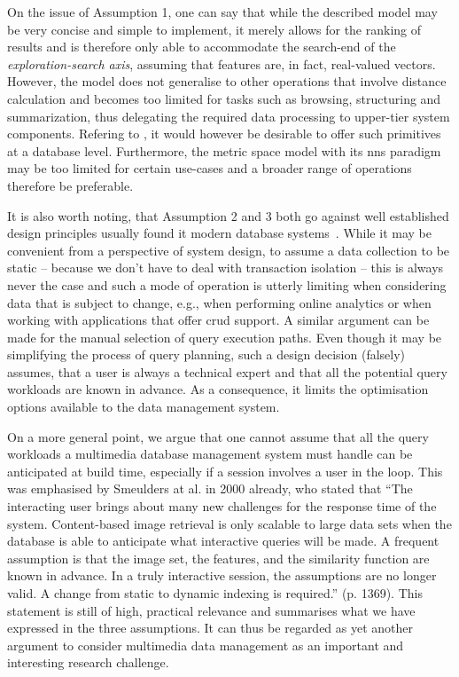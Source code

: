 On the issue of Assumption 1, one can say that while the described model may be very concise and simple to implement, it merely allows for the ranking of results and is therefore only able to accommodate the search-end of the \emph{exploration-search axis}, assuming that features are, in fact, real-valued vectors. However, the model does not generalise to other operations that involve distance calculation and becomes too limited for tasks such as browsing, structuring and summarization, thus delegating the required data processing to upper-tier system components. Refering to \cite{Jonson:2016Ten}, it would however be desirable to offer such primitives at a database level. Furthermore, the metric space model with its \acrfull{nns} paradigm may be too limited for certain use-cases and a broader range of operations therefore be preferable.

It is also worth noting, that Assumption 2 and 3 both go against well established design principles usually found it modern database systems~\cite{Petrov:2019Database}. While it may be convenient from a perspective of system design, to assume a data collection to be static -- because we don't have to deal with transaction isolation -- this is always never the case and such a mode of operation is utterly limiting when considering data that is subject to change, e.g., when performing online analytics or when working with applications that offer \acrshort{crud} support. A similar argument can be made for the manual selection of query execution paths. Even though it may be simplifying the process of query planning, such a design decision (falsely) assumes, that a user is always a technical expert and that all the potential query workloads are known in advance. As a consequence, it limits the optimisation options available to the data management system. 

On a more general point, we argue that one cannot assume that all the query workloads a multimedia database management system must handle can be anticipated at build time, especially if a session involves a user in the loop. This was emphasised by Smeulders at al. in 2000 already, who stated that ``The interacting user brings about many new challenges for the response time of the system. Content-based image retrieval is only scalable to large data sets when the database is able to anticipate what interactive queries will be made. A frequent assumption is that the image set, the features, and the similarity function are known in advance. In a truly interactive session, the assumptions are no longer valid. A change from static to dynamic indexing is required.'' \cite{Smeulders:2000Content} (p. 1369). This statement is still of high, practical relevance and summarises what we have expressed in the three assumptions. It can thus be regarded as yet another argument to consider multimedia data management as an important and interesting research challenge.

